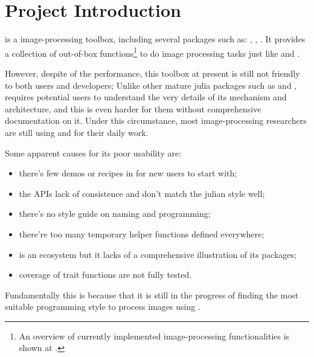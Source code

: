 
\section{Project Introduction}\label{sec:project}

\repoimages{} is a \langjulia image-processing toolbox, including several packages such as: \repoimagecore, \repoimagetransformations, \repoimageaxes. It provides a collection of out-of-box functions\footnote{An overview of currently implemented image-processing functionalities is shown at \apicomparison.} to do image processing tasks just like \reposcikitimage and \matlabimageprocessing.

However, despite of the performance, this toolbox at present is still not friendly to both users and developers; Unlike other mature julia packages such as \repojump and \repogpuarrays, \images{} requires potential users to understand the very details of its mechanism and architecture, and this is even harder for them without comprehensive documentation on it. Under this circumstance, most image-processing researchers are still using \langpython and \langmatlab for their daily work.

Some apparent causes for its poor usability are:
\begin{itemize}
    \item there's few demos or recipes in \images{} for new users to start with;
    \item the APIs lack of consistence and don't match the julian style well;
    \item there's no style guide on naming and programming;
    \item there're too many temporary helper functions defined everywhere;
    \item \images{} is an ecosystem but it lacks of a comprehensive illustration of its packages;
    \item coverage of trait functions are not fully tested.
\end{itemize}
Fundamentally this is because that it is still in the progress of finding the most suitable programming style to process images using \langjulia.

